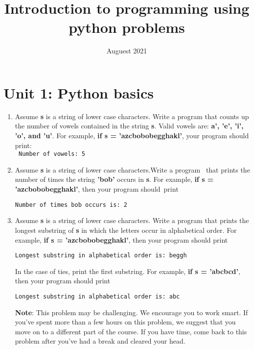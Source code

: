 \documentclass{article}
\title{Introduction to programming using python problems}
\date{Auguest 2021}
\begin{document}
\maketitle
\pagebreak
\tableofcontents
\pagebreak
\section*{Unit 1: Python basics}

\begin{enumerate}

  \item Assume \textbf{s} is a string of lower case characters. Write a program
    that counts up the number of vowels contained in the string \textbf{s}. Valid
    vowels are: \textbf{a', 'e', 'i', 'o', and 'u'}. For example,
    \textbf{if s = 'azcbobobegghakl'}, your program should print:\\
    \verb| Number of vowels: 5|

  \item Assume \textbf{s} is a string of lower case characters.Write a program \
    that prints the number of times the string \textbf{'bob'} occurs in \textbf{s}.
    For example, \textbf{if s = 'azcbobobegghakl'}, then your program should\
    print

    \verb|Number of times bob occurs is: 2|

  \item Assume \textbf{s} is a string of lower case characters. Write a program
    that prints the longest substring of \textbf{s} in which the letters occur
    in alphabetical order. For example, \textbf{if s = 'azcbobobegghakl'}, then
    your program should print

    \verb|Longest substring in alphabetical order is: beggh|

    In the case of ties, print the first substring. For example, \textbf{if s = 'abcbcd'},
    then your program should print

    \verb|Longest substring in alphabetical order is: abc|

    \textbf{Note}: This problem may be challenging. We encourage you to work smart. If
    you've spent more than a few hours on this problem, we suggest that you move
    on to a different part of the course. If you have time, come back to this
    problem after you've had a break and cleared your head.

\end{enumerate}

\pagebreak
\end{document}
